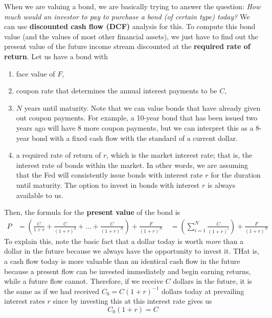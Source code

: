 \documentclass{article}
\begin{document}
    When we are valuing a bond, we are basically trying to answer the question: \textit{How much would an investor to pay to purchase a bond (of certain type) today?} We can use \textbf{discounted cash flow (DCF)} analysis for this. To compute this bond value (and the values of most other financial assets), we just have to find out the present value of the future income stream discounted at the \textbf{required rate of return}. Let us have a bond with

    \begin{enumerate}
      \item face value of $F$,
      \item coupon rate that determines the annual interest payments to be $C$,
      \item $N$ years until maturity. Note that we can value bonds that have already given out coupon payments. For example, a 10-year bond that has been issued two years ago will have 8 more coupon payments, but we can interpret this as a 8-year bond with a fixed cash flow with the standard of a current dollar.
      \item a required rate of return of $r$, which is the market interest rate; that is, the interest rate of bonds within the market. In other words, we are assuming that the Fed will consistently issue bonds with interest rate $r$ for the duration until maturity. The option to invest in bonds with interest $r$ is always available to us.
    \end{enumerate}
    Then, the formula for the \textbf{present value} of the bond is
    \begin{align*}
      P & = \left( \frac{C}{1 + r} + \frac{C}{(1+r)^2} + \ldots + \frac{C}{(1+r)^N} \right) + \frac{F}{(1+r)^N} \
      & = \left( \sum_{i=1}^N \frac{C}{(1+r)^i} \right) + \frac{F}{(1+r)^N}
    \end{align*}
    To explain this, note the basic fact that a dollar today is worth \textit{more} than a dollar in the future because we always have the opportunity to invest it. THat is, a cash flow today is more valuable than an identical cash flow in the future because a present flow can be invested immediately and begin earning returns, while a future flow cannot. Therefore, if we receive $C$ dollars in the future, it is the same as if we had received $C_0 = C (1 + r)^{-1}$ dollars today at prevailing interest rates $r$ since by investing this at this interest rate gives us
    \begin{equation}
      C_0 (1+r) = C
    \end{equation}
\end{document}
